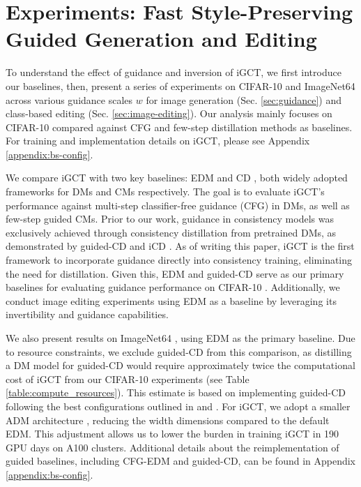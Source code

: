 \vspace{-0.2cm}
\section{Experiments: Fast Style-Preserving Guided Generation and Editing}
\label{sec:results} 
\vspace{-0.1cm}

To understand the effect of guidance and inversion of iGCT, we first introduce our baselines, then, present a series of experiments on CIFAR-10 \cite{article} and ImageNet64 \cite{chrabaszcz2017downsampledvariantimagenetalternative} across various guidance scales \(w\) for image generation (Sec. \ref{sec:guidance}) and class-based editing (Sec. \ref{sec:image-editing}). Our analysis mainly focuses on CIFAR-10 compared against CFG and few-step distillation methods as baselines. For training and implementation details on iGCT, please see Appendix \ref{appendix:bs-config}.


 We compare iGCT with two key baselines: EDM \cite{karras2022elucidating} and CD \cite{song2023consistency}, both widely adopted frameworks for DMs and CMs respectively. The goal is to evaluate iGCT’s performance against multi-step classifier-free guidance (CFG) in DMs, as well as few-step guided CMs. Prior to our work, guidance in consistency models was exclusively achieved through consistency distillation from pretrained DMs, as demonstrated by guided-CD and iCD \cite{luo2023latent,starodubcev2024invertible}. As of writing this paper, iGCT is the first framework to incorporate guidance directly into consistency training, eliminating the need for distillation. Given this, EDM and guided-CD serve as our primary baselines for evaluating guidance performance on CIFAR-10 \cite{article}. Additionally, we conduct image editing experiments using EDM as a baseline by leveraging its invertibility and guidance capabilities. 

We also present results on ImageNet64 \cite{chrabaszcz2017downsampledvariantimagenetalternative}, using EDM as the primary baseline. Due to resource constraints, we exclude guided-CD from this comparison, as distilling a DM model for guided-CD would require approximately twice the computational cost of iGCT from our CIFAR-10 experiments (see Table \ref{table:compute_resources}). This estimate is based on implementing guided-CD following the best configurations outlined in \cite{song2023consistency} and \cite{luo2023latent}. For iGCT, we adopt a smaller ADM architecture \cite{dhariwal2021diffusionmodelsbeatgans}, reducing the width dimensions compared to the default EDM. This adjustment allows us to lower the burden in training iGCT in 190 GPU days on A100 clusters. Additional details about the reimplementation of guided baselines, including CFG-EDM and guided-CD, can be found in Appendix \ref{appendix:bs-config}.


